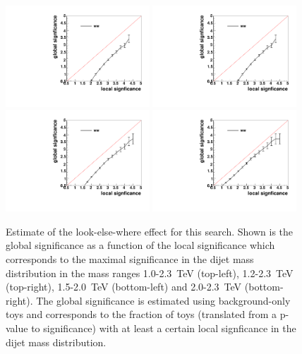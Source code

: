 \begin{figure}[htb]
\begin{center}
\includegraphics[width=0.48\textwidth,angle=0]{figs/appendix/Xvv_WW_8TeV_Sig_channel2_toys_1000_2300.pdf}
\includegraphics[width=0.48\textwidth,angle=0]{figs/appendix/Xvv_WW_8TeV_Sig_channel2_toys_1200_2300.pdf}
\includegraphics[width=0.48\textwidth,angle=0]{figs/appendix/Xvv_WW_8TeV_Sig_channel2_toys_1500_2000.pdf}
\includegraphics[width=0.48\textwidth,angle=0]{figs/appendix/Xvv_WW_8TeV_Sig_channel2_toys_2000_2300.pdf}
\end{center}
\caption{Estimate of the look-else-where effect for this search.
Shown is the global significance as a function
of the local significance which corresponds to the maximal significance in the dijet mass distribution in the
mass ranges 1.0-2.3~TeV (top-left), 1.2-2.3~TeV (top-right), 1.5-2.0~TeV (bottom-left) and 2.0-2.3~TeV (bottom-right).
The global significance is estimated using background-only toys and corresponds to the fraction of toys
(translated from a p-value to significance) with at least a certain local signficance in the dijet mass distribution.}
\label{fig:lee}
\end{figure}

